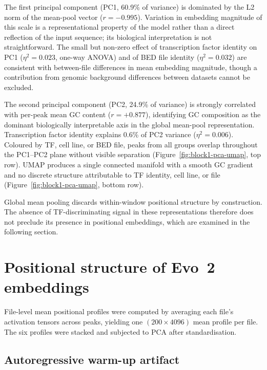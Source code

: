 \documentclass[12pt,a4paper,twoside,final]{book}
\begin{document}
The first principal component (PC1, 60.9\% of variance) is dominated
by the L2 norm of the mean-pool vector ($r = -0.995$).
Variation in embedding magnitude of this scale is a representational
property of the model rather than a direct reflection of the input
sequence; its biological interpretation is not straightforward.
The small but non-zero effect of transcription factor identity on PC1
($\eta^2 = 0.023$, one-way ANOVA) and of BED file identity
($\eta^2 = 0.032$) are consistent with between-file differences in
mean embedding magnitude, though a contribution from genomic
background differences between datasets cannot be excluded.

The second principal component (PC2, 24.9\% of variance) is strongly
correlated with per-peak mean GC content ($r = +0.877$), identifying
GC composition as the dominant biologically interpretable axis in the
global mean-pool representation.
Transcription factor identity explains 0.6\% of PC2 variance
($\eta^2 = 0.006$).
Coloured by TF, cell line, or BED file, peaks from all groups overlap
throughout the PC1--PC2 plane without visible separation
(Figure~\ref{fig:block1-pca-umap}, top row).
UMAP produces a single connected manifold with a smooth GC gradient
and no discrete structure attributable to TF identity, cell line,
or file (Figure~\ref{fig:block1-pca-umap}, bottom row).

Global mean pooling discards within-window positional structure by
construction.
The absence of TF-discriminating signal in these representations
therefore does not preclude its presence in positional embeddings,
which are examined in the following section.

\section{Positional structure of Evo~2 embeddings}
\label{sec:results-block2}

File-level mean positional profiles were computed by averaging each
file's activation tensors across peaks, yielding one $(200 \times 4096)$
mean profile per file.
The six profiles were stacked and subjected to PCA after
standardisation.

\subsection*{Autoregressive warm-up artifact}
\end{document}
